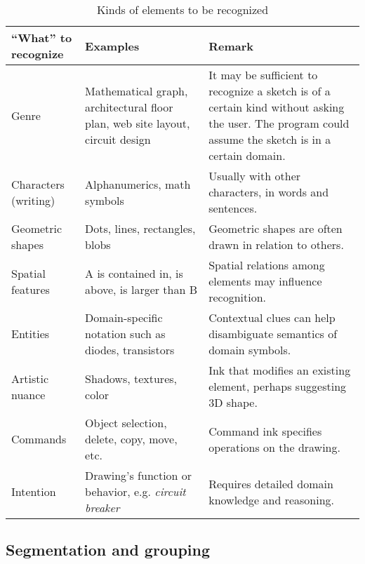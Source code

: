 \begin{landscape}
\begin{table}
\label{tab:what}
\begin{tabular}{ p{4cm} | p{4.5cm} | p{5.5cm} }
\textbf{``What'' to recognize} & 
\textbf{Examples} & 
\textbf{Remark} \\ 
\hline \hline

Genre &
Mathematical graph, architectural floor plan, web site layout, circuit design &

It may be sufficient to recognize a sketch is of a certain kind
without asking the user. The program could assume the sketch is
in a certain domain.\\ \hline

Characters (writing) & 
Alphanumerics, math symbols & 
Usually with other characters, in words and sentences. \\ \hline

Geometric shapes & 
Dots, lines, rectangles, blobs &
Geometric shapes are often drawn in relation to others. \\ \hline

Spatial features &
A is contained in, is above, is larger than B &
Spatial relations among elements may influence recognition. \\ \hline

Entities &
Domain-specific notation such as diodes, transistors &
Contextual clues can help disambiguate semantics of domain symbols. \\ \hline

Artistic nuance &
Shadows, textures, color &
Ink that modifies an existing element, perhaps suggesting 3D shape. \\ \hline

Commands &
Object selection, delete, copy, move, etc. &
Command ink specifies operations on the drawing. \\ \hline

Intention &
Drawing's function or behavior, e.g. \textit{circuit breaker} & 
Requires detailed domain knowledge and reasoning. \\ \hline

\end{tabular}
\caption{Kinds of elements to be recognized}
\end{table}
\end{landscape}


\subsection{Segmentation and grouping}
\label{sec:recognition-segmentation}

